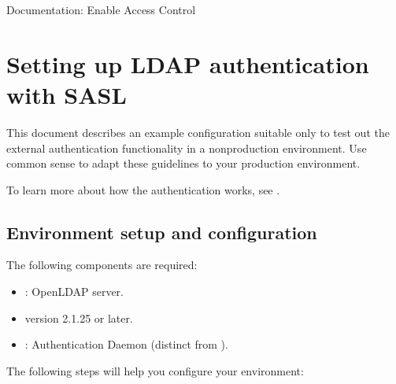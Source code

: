 \documentclass[letterpaper,10pt,english]{sphinxmanual}
\begin{document}
\nopagebreak

\begin{description}
\item[{ Documentation: Enable Access Control}] \leavevmode
\sphinxAtStartPar
{}

\end{description}




\chapter{Setting up LDAP authentication with SASL}
\label{\detokenize{sasl-auth:setting-up-ldap-authentication-with-sasl}}\label{\detokenize{sasl-auth:sasl}}\label{\detokenize{sasl-auth::doc}}
\sphinxAtStartPar
This document describes an example configuration
suitable only to test out the external authentication functionality
in a non\sphinxhyphen{}production environment.
Use common sense to adapt these guidelines to your production environment.

\sphinxAtStartPar
To learn more about how the authentication works, see {\hyperref[\detokenize{authentication:ldap-authentication-sasl}]{}}.


\section{Environment setup and configuration}
\label{\detokenize{sasl-auth:environment-setup-and-configuration}}
\sphinxAtStartPar
The following components are required:
\begin{itemize}
\item {} 
\sphinxAtStartPar
{}: OpenLDAP server.

\item {} 
\sphinxAtStartPar
{} version 2.1.25 or later.

\item {} 
\sphinxAtStartPar
{}:  Authentication Daemon (distinct from ).

\end{itemize}

\sphinxAtStartPar
The following steps will help you configure your environment:
\end{document}

